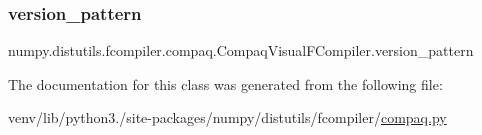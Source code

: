 \subsubsection{\texorpdfstring{version\+\_\+pattern}{version\_pattern}}
{\footnotesize\ttfamily numpy.\+distutils.\+fcompiler.\+compaq.\+Compaq\+Visual\+F\+Compiler.\+version\+\_\+pattern\hspace{0.3cm}{\ttfamily [static]}}



The documentation for this class was generated from the following file\+:\begin{DoxyCompactItemize}
\item 
venv/lib/python3./site-\/packages/numpy/distutils/fcompiler/\hyperlink{compaq_8py}{compaq.\+py}\end{DoxyCompactItemize}
